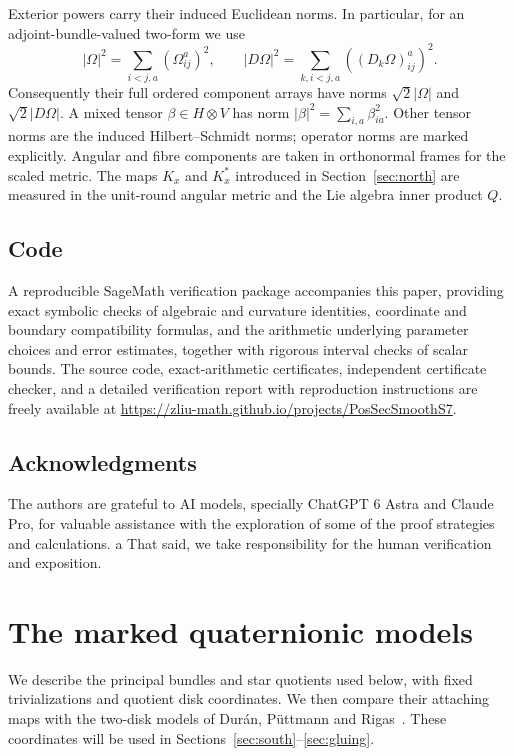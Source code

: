 \documentclass[12pt]{amsart}
\numberwithin{equation}{section}
\theoremstyle{remark}
\begin{document}
Exterior powers carry their induced Euclidean norms. In particular,
for an adjoint-bundle-valued two-form we use
\begin{equation}\label{eq:normconvention}
 |\Omega|^2=\sum_{i<j,a}(\Omega_{ij}^a)^2,
 \qquad |D\Omega|^2=\sum_{k,i<j,a}((D_k\Omega)_{ij}^a)^2.
\end{equation}
Consequently their full ordered component arrays have norms
\(\sqrt2|\Omega|\) and \(\sqrt2|D\Omega|\). A mixed tensor
\(\beta\in H\otimes V\) has norm
\(|\beta|^2=\sum_{i,a}\beta_{ia}^2\). Other tensor norms are the induced
Hilbert--Schmidt norms; operator norms are marked explicitly.
Angular and fibre components are taken in orthonormal frames for the
scaled metric. The maps \(K_x\) and \(K_x^*\) introduced in
Section~\ref{sec:north} are measured in the unit-round angular metric
and the Lie algebra inner product \(Q\).

\subsection*{Code}
A reproducible SageMath verification package accompanies this paper, providing exact symbolic checks of algebraic and curvature identities,
coordinate and boundary compatibility formulas, and the arithmetic underlying parameter choices and error estimates, together with rigorous
interval checks of scalar bounds. The source code, exact-arithmetic certificates, independent certificate checker, and a detailed verification report with reproduction instructions
are freely available at \href{https://zliu-math.github.io/projects/PosSecSmoothS7}{https://zliu-math.github.io/projects/PosSecSmoothS7}.




\subsection*{Acknowledgments}
The authors are grateful to AI models, specially ChatGPT 6 Astra and Claude Pro, for valuable assistance with the exploration of some of the proof strategies and calculations. a
That said, we take responsibility for the human verification and exposition.

\section{The marked quaternionic models}\label{sec:carrier}

We describe the principal bundles and star quotients used below, with
fixed trivializations and quotient disk coordinates. We then compare
their attaching maps with the two-disk models of
Dur\'an, P\"uttmann and Rigas~\cite{DPR}. These coordinates will be used in
Sections~\ref{sec:south}--\ref{sec:gluing}.
\end{document}
